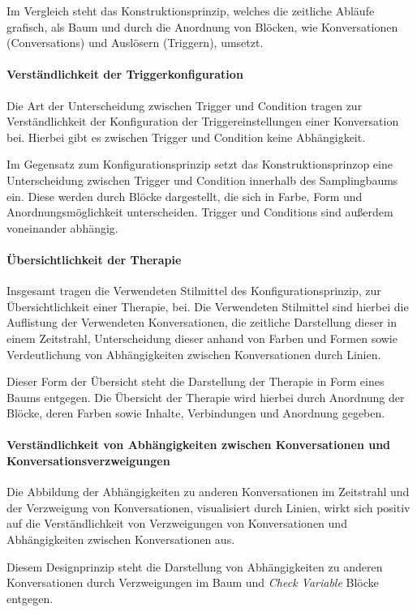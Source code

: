 Im Vergleich steht das Konstruktionsprinzip, welches die zeitliche Abläufe grafisch, als Baum und durch die Anordnung von Blöcken, wie Konversationen (Conversations) und Auslösern (Triggern), umsetzt.

\paragraph{Verständlichkeit der Triggerkonfiguration}
Die Art der Unterscheidung zwischen Trigger und Condition tragen zur Verständlichkeit der Konfiguration der Triggereinstellungen einer Konversation bei. Hierbei gibt es zwischen Trigger und Condition keine Abhängigkeit. 

Im Gegensatz zum Konfigurationsprinzip setzt das Konstruktionsprinzop eine Unterscheidung zwischen Trigger und Condition innerhalb des Samplingbaums ein. Diese werden durch Blöcke dargestellt, die sich in Farbe, Form und Anordnungsmöglichkeit unterscheiden. Trigger und Conditions sind außerdem voneinander abhängig.

\paragraph{Übersichtlichkeit der Therapie}
Insgesamt tragen die Verwendeten Stilmittel des Konfigurationsprinzip, zur Übersichtlichkeit einer Therapie, bei. Die Verwendeten Stilmittel sind hierbei die Auflistung der Verwendeten Konversationen, die zeitliche Darstellung dieser in einem Zeitstrahl, Unterscheidung dieser anhand von Farben und Formen sowie Verdeutlichung von Abhängigkeiten zwischen Konversationen durch Linien. 

Dieser Form der Übersicht steht die Darstellung der Therapie in Form eines Baums entgegen. Die Übersicht der Therapie wird hierbei durch Anordnung der Blöcke, deren Farben sowie Inhalte, Verbindungen und Anordnung gegeben. 


\paragraph{Verständlichkeit von Abhängigkeiten zwischen Konversationen und Konversationsverzweigungen}
Die Abbildung der Abhängigkeiten zu anderen Konversationen im Zeitstrahl und der Verzweigung von Konversationen, visualisiert durch Linien, wirkt sich positiv auf die Verständlichkeit von Verzweigungen von Konversationen und Abhängigkeiten zwischen Konversationen aus. 

Diesem Designprinzip steht die Darstellung von  Abhängigkeiten zu anderen Konversationen durch Verzweigungen im Baum und \emph{Check Variable} Blöcke entgegen. 
 

